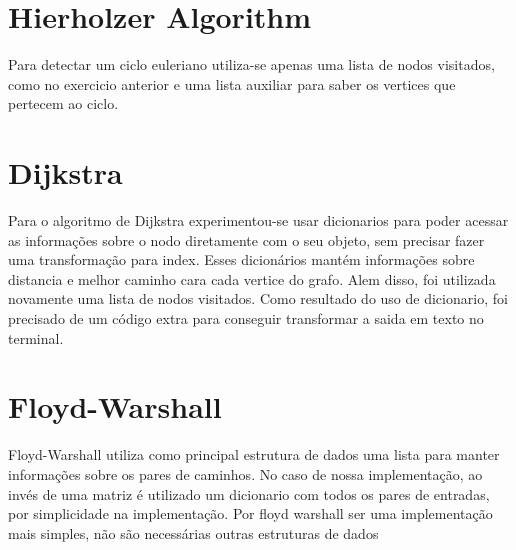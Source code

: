 \documentclass{article}
\begin{document}
\section{Hierholzer Algorithm}
Para detectar um ciclo euleriano utiliza-se apenas uma lista de nodos visitados, como no exercicio anterior e uma lista auxiliar para saber os vertices que pertecem ao ciclo.

\section{Dijkstra}
Para o algoritmo de Dijkstra experimentou-se usar dicionarios para poder acessar as informações sobre o nodo diretamente com o seu objeto, sem precisar fazer uma transformação para index. Esses dicionários mantém informações sobre distancia e melhor caminho cara cada vertice do grafo. Alem disso, foi utilizada novamente uma lista de nodos visitados. Como resultado do uso de dicionario, foi precisado de um código extra para conseguir transformar a saida em texto no terminal.

\section{Floyd-Warshall}
Floyd-Warshall utiliza como principal estrutura de dados uma lista  para manter informações sobre os pares de caminhos. No caso de nossa implementação, ao invés de uma matriz é utilizado um dicionario com todos os pares de entradas, por simplicidade na implementação. Por floyd warshall ser uma implementação mais simples, não são necessárias outras estruturas de dados
\end{document}

